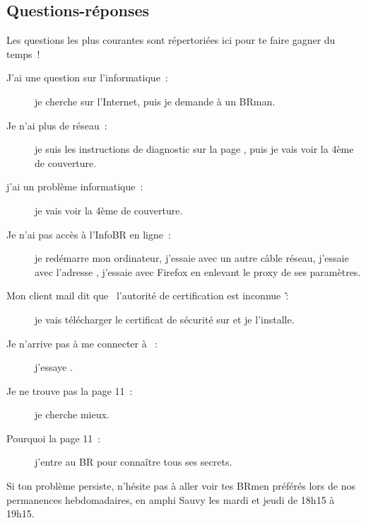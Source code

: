 \subsection{Questions-réponses}

Les questions les plus courantes sont répertoriées ici pour te faire gagner du temps~!

\begin{description}

\item[J'ai une question sur l'informatique~: ] je cherche sur l'Internet, puis je demande à un BRman.

\item[Je n'ai plus de réseau~: ] je suis les instructions de diagnostic sur la page \pageref{diagnostic}, puis je vais voir la 4ème de couverture.

\item[j'ai un problème informatique~: ] je vais voir la 4ème de couverture.

\item[Je n'ai pas accès à l'InfoBR en ligne~: ] je redémarre mon ordinateur, j'essaie avec un autre câble réseau, j'essaie avec l'adresse , j'essaie avec Firefox en enlevant le proxy de ses paramètres.

\item[Mon client mail dit que \og~l'autorité de certification est inconnue~\fg\~: ] je vais télécharger le certificat de sécurité
sur  et je l'installe.

\item[Je n'arrive pas à me connecter à ~: ] j'essaye .

\item[Je ne trouve pas la page 11~: ] je cherche mieux.

\item[Pourquoi la page 11~: ] j'entre au BR pour connaître tous ses secrets.

\end{description}

Si ton problème persiste, n'hésite pas à aller voir tes BRmen préférés lors de nos permanences hebdomadaires, en amphi Sauvy les mardi et jeudi de 18h15 à 19h15.
